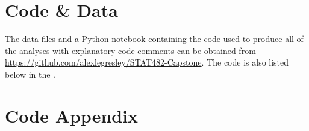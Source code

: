 \documentclass[letterpaper,titlepage]{article}
\begin{document}
    \section{Code \& Data}
    The data files and a Python notebook containing the code used to produce all of the analyses with explanatory code comments can be obtained from \url{https://github.com/alexlegresley/STAT482-Capstone}. The code is also listed below in the .


    \section{Code Appendix}
    \label{CodeAppendix}
    \inputminted[breaklines,linenos,tabsize=4,frame=lines,framesep=2mm,bgcolor=LightGray]{python}{Code.py}
    
\end{document}
